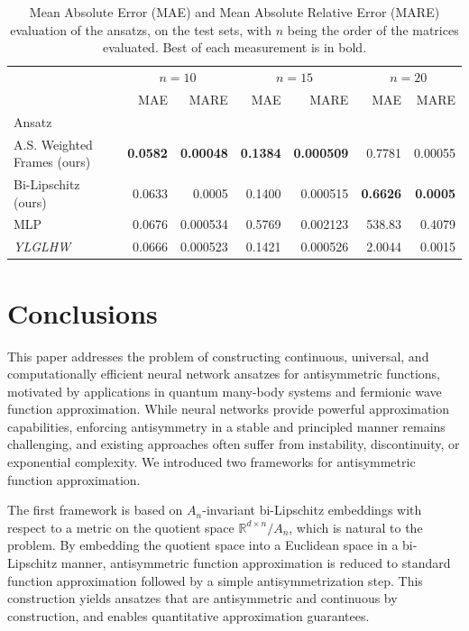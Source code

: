 \documentclass{amsart}
\theoremstyle{plain}
\theoremstyle{definition}
\theoremstyle{remark}
\newcommand{\RR}{\mathbb{R}}
\begin{document}
\begin{table}[!h]
\centering
\begin{tabular}{lrrrrrr}
\toprule
 & \multicolumn{2}{c}{$n = 10$} & \multicolumn{2}{c}{$n = 15$} & \multicolumn{2}{c}{$n = 20$} \\
 & MAE & MARE & MAE & MARE & MAE & MARE \\
Ansatz &   &  &  \\
\midrule
A.S. Weighted Frames (ours) & \bfseries 0.0582 & \bfseries 0.00048 & \bfseries 0.1384 & \bfseries 0.000509 & 0.7781 & 0.00055 \\
Bi-Lipschitz (ours) & \color{black} 0.0633 & 0.0005 & \color{black} 0.1400 & 0.000515 & \color{black} \bfseries 0.6626 & \bfseries 0.0005 \\
MLP & 0.0676 & 0.000534 & 0.5769 & 0.002123 & 538.83 & 0.4079 \\
\textit{YLGLHW} \cite{ye2024widetilde} & 0.0666 & 0.000523 & 0.1421 & 0.000526 & 2.0044 & 0.0015 \\
\bottomrule
\end{tabular}
\caption{Mean Absolute Error (MAE) and Mean Absolute Relative Error (MARE) evaluation of the ansatzs, on the test sets, with $n$ being the order of the matrices evaluated. Best of each measurement is in bold.}
  \label{exp:res}
\end{table}

\newpage
\section{Conclusions}
This paper addresses the problem of constructing continuous, universal, and computationally efficient neural network ansatzes for antisymmetric functions, motivated by applications in quantum many-body systems and fermionic wave function approximation. While neural networks provide powerful approximation capabilities, enforcing antisymmetry in a stable and principled manner remains challenging, and existing approaches often suffer from instability, discontinuity, or exponential complexity.
We introduced two frameworks for antisymmetric function approximation.

The first framework is based on $A_n$-invariant bi-Lipschitz embeddings with respect to a metric on the quotient space $\RR^{d \times n} / A_n$, which is natural to the problem. By embedding the quotient space into a Euclidean space in a bi-Lipschitz manner, antisymmetric function approximation is reduced to standard function approximation followed by a simple antisymmetrization step. This construction yields ansatzes that are antisymmetric and continuous by construction, and enables quantitative approximation guarantees.
\end{document}
